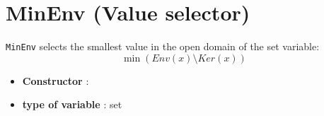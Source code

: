 \section{MinEnv (Value selector)}\label{minenv:minenvvalselector}\hypertarget{minenv:minenvvalselector}{}
\begin{notedef}
  \texttt{MinEnv} selects the smallest value in the open domain of the set variable:
$$\min(Env(x)\setminus Ker(x))$$
\end{notedef}

\begin{itemize}
	\item \textbf{Constructor} : 
	\item \textbf{type of variable} : set
\end{itemize}

%

